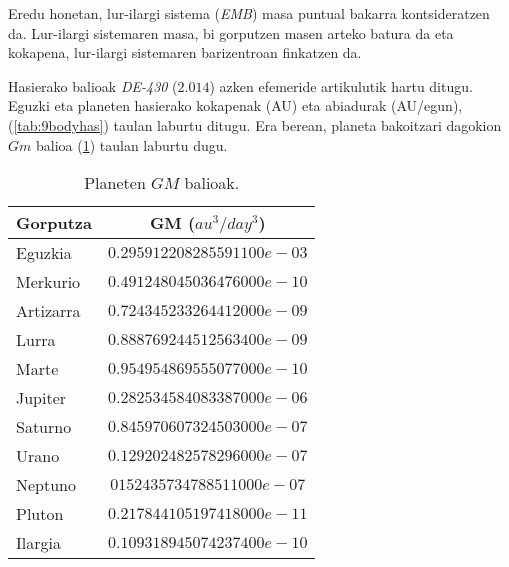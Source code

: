 Eredu honetan, lur-ilargi sistema (\emph{EMB}) masa puntual bakarra kontsideratzen da. Lur-ilargi sistemaren masa, bi gorputzen masen arteko batura da eta kokapena, lur-ilargi sistemaren barizentroan finkatzen da.
  
Hasierako balioak \emph{DE-430} ($2.014$) \cite{Folkner2014} azken efemeride artikulutik hartu ditugu. Eguzki eta planeten hasierako kokapenak (AU) eta abiadurak (AU/egun), (\ref{tab:9bodyhas}) taulan laburtu ditugu. Era berean, planeta bakoitzari dagokion $Gm$ balioa (\ref{tab:9bodymas}) taulan laburtu dugu. 

\begin{table}[h]
\caption{Planeten $GM$ balioak.}
\label{tab:9bodymas}       %
\centering
\begin{tabular}{l c }
\hline 
  Gorputza         &  GM ($au^3/day^3$)          \\
  \hline
  Eguzkia          &  $0.295912208285591100e-03$ \\
  Merkurio         &  $0.491248045036476000e-10$ \\
  Artizarra        &  $0.724345233264412000e-09$ \\
  Lurra            &  $0.888769244512563400e-09$ \\
  Marte            &  $0.954954869555077000e-10$ \\
  Jupiter          &  $0.282534584083387000e-06$ \\
  Saturno          &  $0.845970607324503000e-07$ \\
  Urano            &  $0.129202482578296000e-07$ \\
  Neptuno          &  $0152435734788511000e-07$ \\
  Pluton           &  $0.217844105197418000e-11$ \\
  Ilargia          &  $0.109318945074237400e-10$ \\
\hline
\end{tabular}
\end{table}

